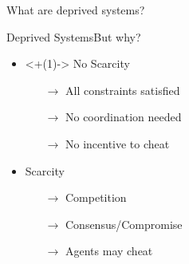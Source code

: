 \documentclass[aspectratio=169]{beamer}
\begin{document}
\begin{frame}{What are deprived systems?}{}
\end{frame}

\begin{frame}{Deprived Systems}{But why?}
  \centering
  \begin{minipage}[t]{.45\linewidth}
    \begin{itemize}
      \item<+(1)-> No Scarcity
            \begin{itemize}[<+(1)->]
              \item[$\to$] All constraints satisfied
              \item[$\to$] No coordination needed
              \item[$\to$] No incentive to cheat
            \end{itemize}
    \end{itemize}
  \end{minipage}
  \hfill
  \begin{minipage}[t]{.45\linewidth}
    \begin{itemize}[<+(1)->]
      \item Scarcity
            \begin{itemize}[<+(1)->]
              \item[$\to$] Competition
              \item[$\to$] Consensus/Compromise
              \item[$\to$] Agents may cheat {\color{red}\faUserSecret}
            \end{itemize}
    \end{itemize}
  \end{minipage}
\end{frame}
\end{document}
